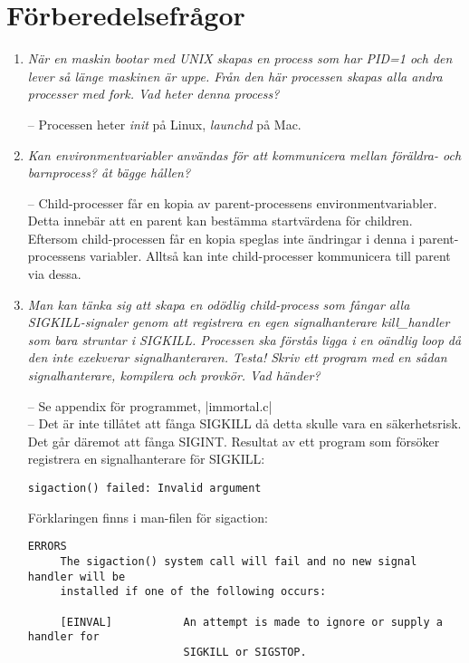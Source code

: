 \documentclass[paper=a4, fontsize=11pt]{scrartcl} %
\numberwithin{equation}{section} %
\numberwithin{figure}{section} %
\numberwithin{table}{section} %
\begin{document}
\section{Förberedelsefrågor}
\begin{enumerate}[1)]
\item \emph{När en maskin bootar med UNIX skapas en process som har PID=1 och
  den lever så länge maskinen är uppe. Från den här processen skapas alla andra
processer med fork. Vad heter denna process?}

-- Processen heter \emph{init} på Linux, \emph{launchd} på Mac.

\item \emph{Kan environmentvariabler användas för att kommunicera mellan
  föräldra- och barnprocess? åt bägge hållen?}

-- Child-processer får en kopia av parent-processens environmentvariabler.
Detta innebär att en parent kan bestämma startvärdena för children.
Eftersom child-processen får en kopia speglas inte ändringar i denna i
parent-processens variabler. Alltså kan inte child-processer kommunicera till
parent via dessa.

\item \emph{Man kan tänka sig att skapa en odödlig child-process som fångar
  alla SIGKILL-signaler genom att registrera en egen signalhanterare
kill\_handler som bara struntar i SIGKILL. Processen ska förstås ligga i en
oändlig loop då den inte exekverar signalhanteraren. Testa! Skriv ett program
med en sådan signalhanterare, kompilera och provkör. Vad händer?}

-- Se appendix för programmet, |immortal.c| \\
-- Det är inte tillåtet att fånga SIGKILL då detta skulle vara en
säkerhetsrisk. Det går däremot att fånga SIGINT.
Resultat av ett program som försöker registrera en signalhanterare för SIGKILL:

\begin{verbatim}
sigaction() failed: Invalid argument
\end{verbatim}

Förklaringen finns i man-filen för sigaction:
\begin{verbatim}
ERRORS
     The sigaction() system call will fail and no new signal handler will be
     installed if one of the following occurs:

     [EINVAL]           An attempt is made to ignore or supply a handler for
                        SIGKILL or SIGSTOP.
\end{verbatim}


\end{enumerate}
\end{document}
